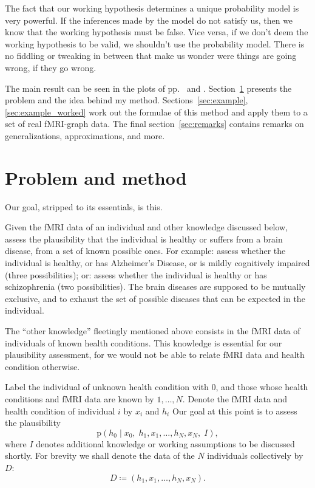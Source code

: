 \documentclass[\ifafour a4paper,12pt,\else a5paper,10pt,\fi%
onecolumn,oneside,article,%
british%
]{memoir}
\theoremstyle{remark}
\theoremstyle{innote}
\newcommand*{\defd}{\coloneqq}
\newcommand*{\pf}{\mathrm{p}}%
\renewcommand*{\|}{\mathpunct{|}}
\newcommand*{\yH}{h}
\newcommand*{\yD}{D}
\newcommand*{\yx}{x}
\newcommand*{\yI}{I}
\theoremstyle{plain}
\begin{document}
The fact that our working hypothesis determines a unique probability model
is very powerful. If the inferences made by the model do not satisfy us,
then we know that the working hypothesis must be false. Vice versa, if we
don't deem the working hypothesis to be valid, we shouldn't use the
probability model. There is no fiddling or tweaking in between that make us
wonder were things are going wrong, if they go wrong.


The main result can be seen in the
plots of pp.~\pageref{results_regions} and
\pageref{results_regions_old}. Section~\ref{sec:problem} presents the
problem and the idea behind my method. Sections~\ref{sec:example},
\ref{sec:example_worked} work out the formulae of this method and apply
them to a set of real fMRI-graph data. The final section~\ref{sec:remarks}
contains remarks on generalizations, approximations, and more.

\section{Problem and method}
\label{sec:problem}

Our goal, stripped to its essentials, is this.

Given the fMRI data of an individual and other knowledge discussed below,
assess the plausibility that the individual is healthy or suffers from a
brain disease, from a set of known possible ones. For example: assess
whether the individual is healthy, or has Alzheimer's Disease, or is mildly
cognitively impaired (three possibilities); or: assess whether the
individual is healthy or has schizophrenia (two possibilities). The brain
diseases are supposed to be mutually exclusive, and to exhaust the set of
possible diseases that can be expected in the individual.

The \enquote{other knowledge} fleetingly mentioned above consists in the
fMRI data of individuals of known health conditions. This knowledge is
essential for our plausibility assessment, for we would not be able to
relate fMRI data and health condition otherwise.

Label the individual of unknown health condition with $0$, and those whose
health conditions and fMRI data are known by $1, \dotsc, N$. Denote the
fMRI data and health condition of individual $i$ by $\yx_i$ and $\yH_i$ Our
goal at this point is to assess the plausibility
\begin{equation}
  \label{eq:goal_1st}
  \pf(\yH_0 \| \yx_0,\; \yH_1,\yx_1, \dotsc, \yH_N, \yx_N,\; \yI),
\end{equation}
where $\yI$ denotes additional knowledge or working assumptions to be
discussed shortly. For brevity we shall denote the data of the $N$
individuals collectively by $\yD$:
\begin{equation}
  \label{eq:collective_data_D}
  D \defd (\yH_1,\yx_1, \dotsc, \yH_N, \yx_N).
\end{equation}
\end{document}
